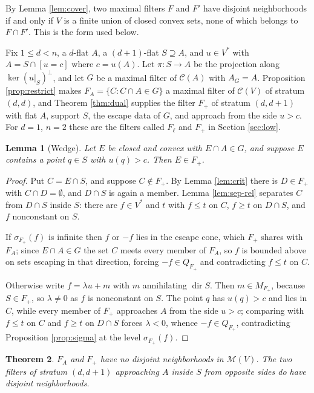 \documentclass[11pt]{amsart}
\theoremstyle{plain}
\newtheorem{theorem}{Theorem}[section]
\newtheorem{lemma}[theorem]{Lemma}
\theoremstyle{definition}
\DeclareMathOperator{\dir}{dir}
\newcommand{\CC}{\mathscr{C}}
\newcommand{\Vs}{V^{*}}
\begin{document}
By Lemma \ref{lem:cover}, two maximal filters $F$ and $F'$ have disjoint neighborhoods if and only if $V$ is a finite union of closed convex sets, none of which belongs to $F\cap F'$. This is the form used below.

Fix $1\le d<n$, a $d$-flat $A$, a $(d+1)$-flat $S\supseteq A$, and $u\in\Vs$ with $A=S\cap[u=c]$ where $c=u(A)$. Let $\pi:S\to A$ be the projection along $\ker(u|_S)^{\perp}$, and let $G$ be a maximal filter of $\CC(A)$ with $A_G=A$. Proposition \ref{prop:restrict} makes $F_A=\{C:C\cap A\in G\}$ a maximal filter of $\CC(V)$ of stratum $(d,d)$, and Theorem \ref{thm:dual} supplies the filter $F_{+}$ of stratum $(d,d+1)$ with flat $A$, support $S$, the escape data of $G$, and approach from the side $u>c$. For $d=1$, $n=2$ these are the filters called $F_\ell$ and $F_{+}$ in Section \ref{sec:low}.

\begin{lemma}[Wedge]\label{lem:wedge}
Let $E$ be closed and convex with $E\cap A\in G$, and suppose $E$ contains a point $q\in S$ with $u(q)>c$. Then $E\in F_{+}$.
\end{lemma}

\begin{proof}
Put $C=E\cap S$, and suppose $C\notin F_{+}$. By Lemma \ref{lem:crit} there is $D\in F_{+}$ with $C\cap D=\emptyset$, and $D\cap S$ is again a member. Lemma \ref{lem:sep-rel} separates $C$ from $D\cap S$ inside $S$: there are $f\in\Vs$ and $t$ with $f\le t$ on $C$, $f\ge t$ on $D\cap S$, and $f$ nonconstant on $S$.

If $\sigma_{F_{+}}(f)$ is infinite then $f$ or $-f$ lies in the escape cone, which $F_{+}$ shares with $F_A$; since $E\cap A\in G$ the set $C$ meets every member of $F_A$, so $f$ is bounded above on sets escaping in that direction, forcing $-f\in Q_{F_{+}}$ and contradicting $f\le t$ on $C$.

Otherwise write $f=\lambda u+m$ with $m$ annihilating $\dir S$. Then $m\in M_{F_{+}}$, because $S\in F_{+}$, so $\lambda\neq0$ as $f$ is nonconstant on $S$. The point $q$ has $u(q)>c$ and lies in $C$, while every member of $F_{+}$ approaches $A$ from the side $u>c$; comparing with $f\le t$ on $C$ and $f\ge t$ on $D\cap S$ forces $\lambda<0$, whence $-f\in Q_{F_{+}}$, contradicting Proposition \ref{prop:sigma} at the level $\sigma_{F_{+}}(f)$.
\end{proof}

\begin{theorem}\label{thm:inseparable}
$F_A$ and $F_{+}$ have no disjoint neighborhoods in $\mathcal{M}(V)$. The two filters of stratum $(d,d+1)$ approaching $A$ inside $S$ from opposite sides do have disjoint neighborhoods.
\end{theorem}
\end{document}
